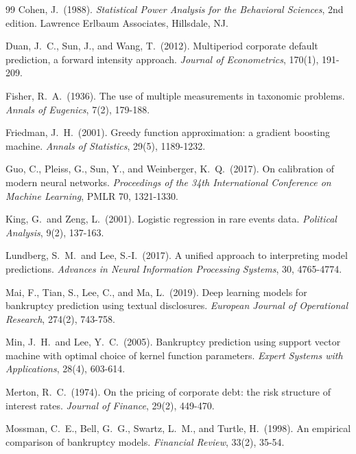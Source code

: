 \documentclass[12pt,a4paper]{article}
\begin{document}
\begin{thebibliography}{99}
Cohen, J.\ (1988).
\newblock \textit{Statistical Power Analysis for the Behavioral Sciences},
2nd edition.
\newblock Lawrence Erlbaum Associates, Hillsdale, NJ.

Duan, J.\ C., Sun, J., and Wang, T.\ (2012).
\newblock Multiperiod corporate default prediction, a forward intensity
approach.
\newblock \textit{Journal of Econometrics}, 170(1), 191-209.

Fisher, R.\ A.\ (1936).
\newblock The use of multiple measurements in taxonomic problems.
\newblock \textit{Annals of Eugenics}, 7(2), 179-188.

Friedman, J.\ H.\ (2001).
\newblock Greedy function approximation: a gradient boosting machine.
\newblock \textit{Annals of Statistics}, 29(5), 1189-1232.

Guo, C., Pleiss, G., Sun, Y., and Weinberger, K.\ Q.\ (2017).
\newblock On calibration of modern neural networks.
\newblock \textit{Proceedings of the 34th International Conference on Machine
Learning}, PMLR 70, 1321-1330.

King, G.\ and Zeng, L.\ (2001).
\newblock Logistic regression in rare events data.
\newblock \textit{Political Analysis}, 9(2), 137-163.

Lundberg, S.\ M.\ and Lee, S.-I.\ (2017).
\newblock A unified approach to interpreting model predictions.
\newblock \textit{Advances in Neural Information Processing Systems}, 30,
4765-4774.

Mai, F., Tian, S., Lee, C., and Ma, L.\ (2019).
\newblock Deep learning models for bankruptcy prediction using textual
disclosures.
\newblock \textit{European Journal of Operational Research}, 274(2), 743-758.

Min, J.\ H.\ and Lee, Y.\ C.\ (2005).
\newblock Bankruptcy prediction using support vector machine with optimal
choice of kernel function parameters.
\newblock \textit{Expert Systems with Applications}, 28(4), 603-614.

Merton, R.\ C.\ (1974).
\newblock On the pricing of corporate debt: the risk structure of interest rates.
\newblock \textit{Journal of Finance}, 29(2), 449-470.

Mossman, C.\ E., Bell, G.\ G., Swartz, L.\ M., and Turtle, H.\ (1998).
\newblock An empirical comparison of bankruptcy models.
\newblock \textit{Financial Review}, 33(2), 35-54.


\end{thebibliography}
\end{document}
